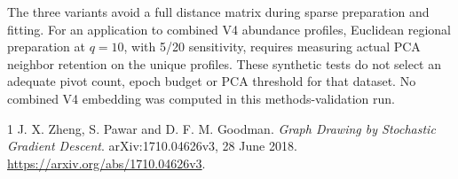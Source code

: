 \documentclass[11pt,letterpaper]{article}
\begin{document}
The three variants avoid a full distance matrix during sparse preparation and
fitting. For an application to combined V4 abundance profiles, Euclidean regional
preparation at $q=10$, with 5/20 sensitivity, requires measuring actual PCA
neighbor retention on the unique profiles. These synthetic tests do not select
an adequate pivot count, epoch budget or PCA threshold for that dataset.
No combined V4 embedding was computed in this methods-validation run.


\begin{thebibliography}{1}
 J. X. Zheng, S. Pawar and D. F. M. Goodman.
\emph{Graph Drawing by Stochastic Gradient Descent}. arXiv:1710.04626v3,
28 June 2018. \url{https://arxiv.org/abs/1710.04626v3}.
\end{thebibliography}
\end{document}
